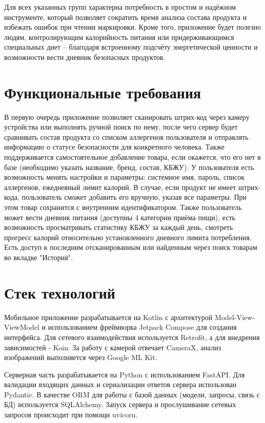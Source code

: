 \documentclass[14pt,a4paper]{extarticle}
\begin{document}
Для всех указанных групп характерна потребность в простом и надёжном инструменте, который позволяет сократить время анализа состава продукта и избежать ошибок при чтении маркировки. Кроме того, приложение будет полезно людям, контролирующим калорийность питания или придерживающимся специальных диет – благодаря встроенному подсчёту энергетической ценности и возможности вести дневник безопасных продуктов.



\section{Функциональные требования}

В первую очередь приложение позволяет сканировать штрих-код через камеру устройства или выполнять ручной поиск по нему, после чего сервер будет сравнивать состав продукта со списком аллергенов пользователя и отправлять информацию о статусе безопасности для конкретного человека. Также поддерживается самостоятельное добавление товара, если окажется, что его нет в базе (необходимо указать название, бренд, состав, КБЖУ). У пользователя есть возможность менять настройки и параметры: системное имя, пароль, список аллергенов, ежедневный лимит калорий. В случае, если продукт не имеет штрих-кода, пользователь сможет добавить его вручную, указав все параметры. При этом товар сохранится с внутренним идентификатором.
Также пользователь может вести дневник питания (доступны 4 категории приёма пищи), есть возможность просматривать статистику КБЖУ за каждый день, смотреть прогресс калорий относительно установленного дневного лимита потребления. Есть доступ к последним отсканированным или найденным через поиск товарам во вкладке "История".


\section{Стек технологий}

Мобильное приложение разрабатывается на Kotlin с архитектурой Model-View-ViewModel и использованием фреймворка Jetpack Compose для создания интерфейса. Для сетевого взаимодействия используется Retrofit, а для внедрения зависимостей - Koin. За работу с камерой отвечает CameraX, анализ изображений выполняется через Google ML Kit.

Серверная часть разрабатывается на Python с использованием FastAPI. Для валидации входящих данных и сериализации ответов сервера использован Pydantic. В качестве ORM для работы с базой данных (модели, запросы, связь с БД) используется SQLAlchemy. Запуск сервера и прослушивание сетевых запросов происходит при помощи uvicorn.
\end{document}
